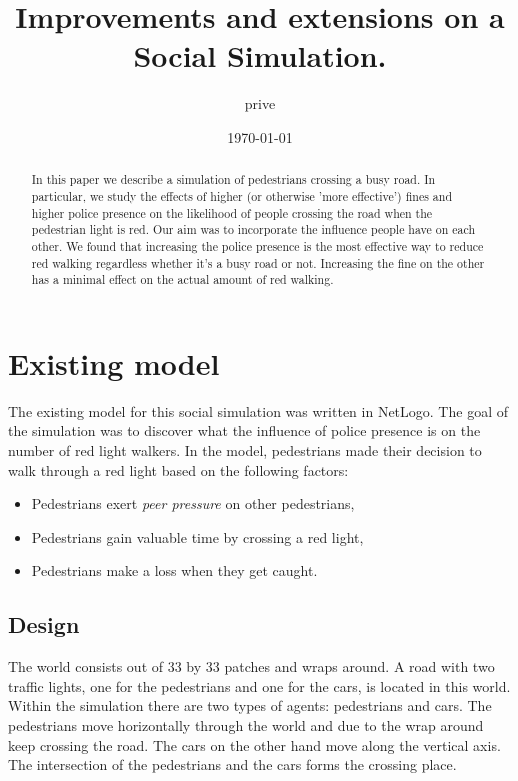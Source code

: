 \documentclass[a4paper]{article}
\title{Improvements and extensions on a Social Simulation.}
\author{prive}
\date{\today}
\begin{document}
\maketitle

\begin{abstract}
	In this paper we describe a simulation of pedestrians crossing a busy road. In particular, we study the effects of higher (or otherwise 'more effective') fines and higher police presence on the likelihood of people crossing the road when the pedestrian light is red. Our aim was to incorporate the influence people have on each other. We found that increasing the police presence is the most effective way to reduce red walking regardless whether it's a busy road or not. Increasing the fine on the other has a minimal effect on the actual amount of red walking.
\end{abstract}

\clearpage
\tableofcontents
\clearpage

\section{Existing model}
The existing model for this social simulation was written in NetLogo. The goal of the simulation was to discover what the influence of police presence is on the number of red light walkers. In the model, pedestrians made their decision to walk through a red light based on the following factors:
\begin{itemize}
\item Pedestrians exert \textit{peer pressure} on other pedestrians,
\item Pedestrians gain valuable time by crossing a red light,
\item Pedestrians make a loss when they get caught.
\end{itemize}

\subsection{Design}
The world consists out of 33 by 33 patches and wraps around. A road with two traffic lights, one for the pedestrians and one for the cars, is located in this world. Within the simulation there are two types of agents: pedestrians and cars. The pedestrians move horizontally through the world and due to the wrap around keep crossing the road. The cars on the other hand move along the vertical axis. The intersection of the pedestrians and the cars forms the crossing place.
\end{document}
